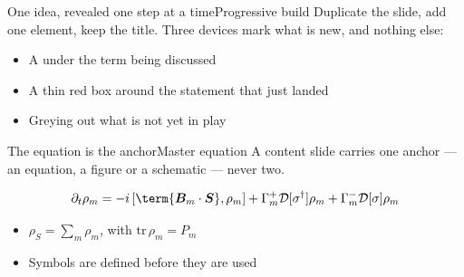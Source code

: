 \documentclass{unibaselbeamer}
\begin{document}
\begin{frame}{One idea, revealed one step at a time}{Progressive build}
  Duplicate the slide, add one element, keep the title. Three devices mark what
  is new, and nothing else:

  \begin{itemize}
    \item<1-> A  under the term being discussed
    \item<2-> A thin red box around the statement that just landed
    \item<3-> Greying out what is not yet in play
  \end{itemize}

  \vspace{1ex}

  \vspace{1ex}
\end{frame}

\begin{frame}{The equation is the anchor}{Master equation}
  A content slide carries one anchor --- an equation, a figure or a schematic ---
  never two.

  \begin{equation*}
    \partial_t \rho_m
      = -i\left[\term{\bm{B}_m\cdot\bm{S}},\rho_m\right]
        + \Gamma_m^{+}\mathcal{D}[\sigma^{\dagger}]\rho_m
        + \Gamma_m^{-}\mathcal{D}[\sigma]\rho_m
  \end{equation*}

  \begin{itemize}
    \item $\rho_S = \sum_m \rho_m$, with $\mathrm{tr}\,\rho_m = P_m$
    \item Symbols are defined before they are used
  \end{itemize}

\end{frame}
\end{document}

